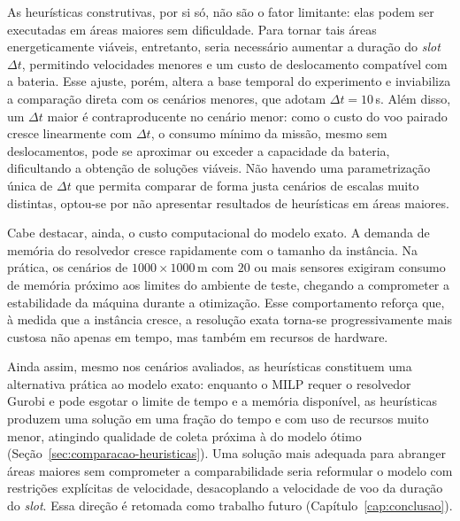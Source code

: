 As heurísticas construtivas, por si só, não são o fator limitante: elas podem ser executadas em áreas maiores sem dificuldade. Para tornar tais áreas energeticamente viáveis, entretanto, seria necessário aumentar a duração do \textit{slot} $\Delta t$, permitindo velocidades menores e um custo de deslocamento compatível com a bateria. Esse ajuste, porém, altera a base temporal do experimento e inviabiliza a comparação direta com os cenários menores, que adotam $\Delta t = 10$\,s. Além disso, um $\Delta t$ maior é contraproducente no cenário menor: como o custo do voo pairado cresce linearmente com $\Delta t$, o consumo mínimo da missão, mesmo sem deslocamentos, pode se aproximar ou exceder a capacidade da bateria, dificultando a obtenção de soluções viáveis. Não havendo uma parametrização única de $\Delta t$ que permita comparar de forma justa cenários de escalas muito distintas, optou-se por não apresentar resultados de heurísticas em áreas maiores.

Cabe destacar, ainda, o custo computacional do modelo exato. A demanda de memória do resolvedor cresce rapidamente com o tamanho da instância. Na prática, os cenários de $1000\times1000$\,m com $20$ ou mais sensores exigiram consumo de memória próximo aos limites do ambiente de teste, chegando a comprometer a estabilidade da máquina durante a otimização. Esse comportamento reforça que, à medida que a instância cresce, a resolução exata torna-se progressivamente mais custosa não apenas em tempo, mas também em recursos de hardware.

Ainda assim, mesmo nos cenários avaliados, as heurísticas constituem uma alternativa prática ao modelo exato: enquanto o MILP requer o resolvedor Gurobi e pode esgotar o limite de tempo e a memória disponível, as heurísticas produzem uma solução em uma fração do tempo e com uso de recursos muito menor, atingindo qualidade de coleta próxima à do modelo ótimo (Seção~\ref{sec:comparacao-heuristicas}). Uma solução mais adequada para abranger áreas maiores sem comprometer a comparabilidade seria reformular o modelo com restrições explícitas de velocidade, desacoplando a velocidade de voo da duração do \textit{slot}. Essa direção é retomada como trabalho futuro (Capítulo~\ref{cap:conclusao}).
